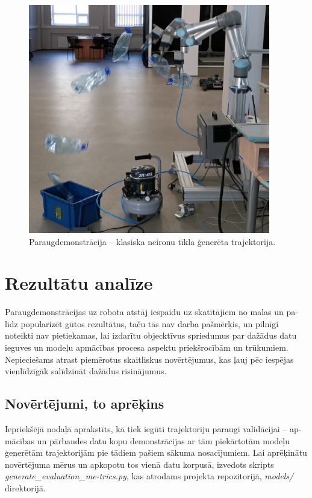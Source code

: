 \documentclass[12pt, a4paper]{article}
\numberwithin{equation}{section} %
\begin{document}
\begin{figure}[t!]
    \centering
    \includegraphics[height=10cm,page=1]{../img/action_sequence.png}
    \caption{Paraugdemonstrācija -- klasiska neironu tīkla ģenerēta trajektorija.}
\end{figure}



%
%
%
%
%
%
%
%
%
%
%
%
%
%
%
%
%
%
%

\newpage
\section{Rezultātu analīze}

Paraugdemonstrācijas uz robota atstāj iespaidu uz skatītājiem no malas un pa-līdz popularizēt gūtos rezultātus, taču tās nav darba pašmērķis, un pilnīgi noteikti nav pietiekamas, lai izdarītu objecktīvus spriedumus par dažādus datu ieguves un modeļu apmācības procesa aspektu priekšrocībām un trūkumiem. Nepieciešams atrast piemērotus skaitliskus novērtējumus, kas ļauj pēc iespējas vienlīdzīgāk salīdzināt dažādus risinājumus.

\subsection{Novērtējumi, to aprēķins}

Iepriekšējā nodaļā aprakstīts, kā tiek iegūti trajektoriju paraugi validācijai -- ap-mācības un pārbaudes datu kopu demonstrācijas ar tām piekārtotām modeļu ģenerētām trajektorijām pie tādiem pašiem sākuma nosacījumiem. Lai aprēķinātu novērtējuma mērus un apkopotu tos vienā datu korpusā, izvedots skripts \textit{generate\_evaluation\_me-trics.py}, kas atrodams projekta repozitorijā, \textit{models/} direktorijā.
\end{document}
